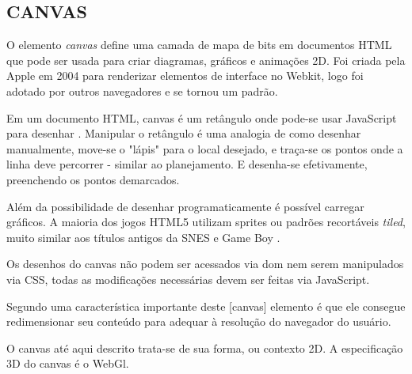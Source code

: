 \subsection{CANVAS}
\begin{draft}
O elemento \textit{canvas} define uma camada de mapa de bits em documentos
HTML que pode ser usada para criar diagramas, gráficos e animações
2D. Foi criada pela Apple em 2004 para renderizar elementos de interface
no Webkit, logo foi adotado por outros navegadores e se tornou um
padrão.

Em um documento HTML, canvas é um retângulo onde pode-se usar
JavaScript para desenhar \autocite[pp. 113]{diveIntohtml}. Manipular o
retângulo é uma analogia de como desenhar manualmente, move-se
o "lápis" para o local desejado, e traça-se os pontos onde a linha
deve percorrer - similar ao planejamento. E desenha-se efetivamente,
preenchendo os pontos demarcados.

Além da possibilidade de desenhar programaticamente é possível carregar
gráficos. A maioria dos jogos HTML5 utilizam sprites ou padrões recortáveis \textit{tiled},
muito similar aos títulos antigos da SNES e Game Boy \autocite{buildingHtml5Game}.

Os desenhos do canvas não podem ser acessados via dom nem serem manipulados via CSS, todas as modificações necessárias devem ser feitas via JavaScript.

Segundo \cite{gwt} uma característica importante deste [canvas]
elemento é que ele consegue redimensionar seu conteúdo para adequar à
resolução do navegador do usuário.

O canvas até aqui descrito trata-se de sua forma, ou contexto 2D. A
especificação 3D do canvas é o WebGl.

\end{draft}
